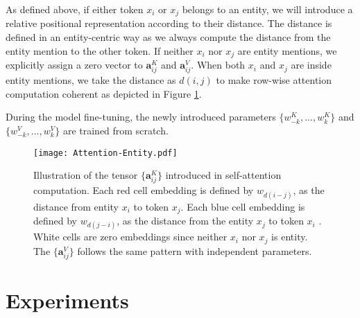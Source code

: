 \documentclass[11pt,a4paper]{article}
\newcommand{\ba}{\mathbf{a}}
\begin{document}
As defined above, if either token $x_i$ or $x_j$ belongs to an entity, we will introduce a relative positional representation according to their distance. The distance is defined in an entity-centric way as we always compute the distance from the entity mention to the other token. If neither $x_i$ nor $x_j$ are entity mentions, we explicitly assign a zero vector to $\ba_{ij}^K$ and $\ba_{ij}^V$. When both $x_i$ and $x_j$ are inside entity mentions, we take the distance as $d(i,j)$ to make row-wise attention computation coherent as depicted in Figure \ref{fig:entity-attention}.

During the model fine-tuning, the newly introduced parameters $\{w_{-k}^K,...,w_k^K\}$ and $\{w_{-k}^V,...,w_k^V\}$  are trained from scratch. 


\begin{figure}[t!]
  \centering
  \texttt{[image: Attention-Entity.pdf]}
  \caption{\small{Illustration of the tensor $\{\ba_{ij}^K\}$ introduced in self-attention computation. Each red cell embedding is defined by $w_{d(i-j)}$, as the distance from entity $x_i$ to token $x_j$. Each blue cell embedding is defined by $w_{d(j-i)}$, as the distance from the entity $x_j$ to token $x_i$ .  White cells are zero embeddings since neither $x_i$ nor $x_j$ is entity. The $\{\ba_{ij}^V\}$ follows the same pattern with independent parameters.}}
  \label{fig:entity-attention}
  \vspace{-2mm}
\end{figure}


\section{Experiments}
\end{document}
